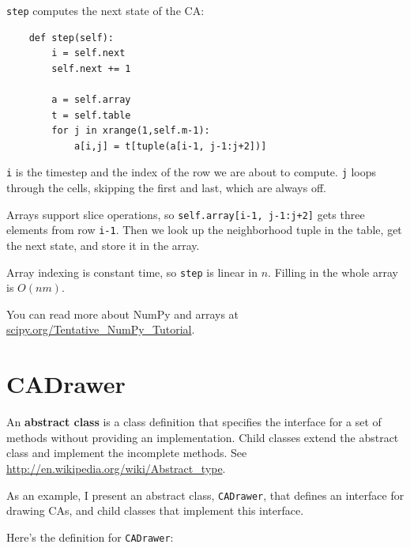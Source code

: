 \documentclass[10pt]{book}
\begin{document}
{\tt step} computes the next state of the CA:

\begin{verbatim}
    def step(self):
        i = self.next
        self.next += 1

        a = self.array
        t = self.table
        for j in xrange(1,self.m-1):
            a[i,j] = t[tuple(a[i-1, j-1:j+2])]
\end{verbatim}

{\tt i} is the timestep and the index of the row we are about to
compute.  {\tt j} loops through the cells, skipping the first and
last, which are always off.

Arrays support slice operations, so {\tt self.array[i-1, j-1:j+2]}
gets three elements from row {\tt i-1}.
Then we look up the neighborhood tuple in the table, get
the next state, and store it in the array.

Array indexing is constant time, so {\tt step} is linear in $n$.
Filling in the whole array is $O(nm)$.

You can read more about NumPy and arrays at
\url{scipy.org/Tentative_NumPy_Tutorial}.


\section{CADrawer}

An {\bf abstract class} is a class definition that specifies the
interface for a set of methods without providing an implementation.
Child classes extend the abstract class and implement the incomplete
methods.  See \url{http://en.wikipedia.org/wiki/Abstract_type}.

As an example, I present an abstract class, {\tt CADrawer},
that defines an interface for drawing CAs, and child classes
that implement this interface.

Here's the definition for {\tt CADrawer}:
\end{document}
